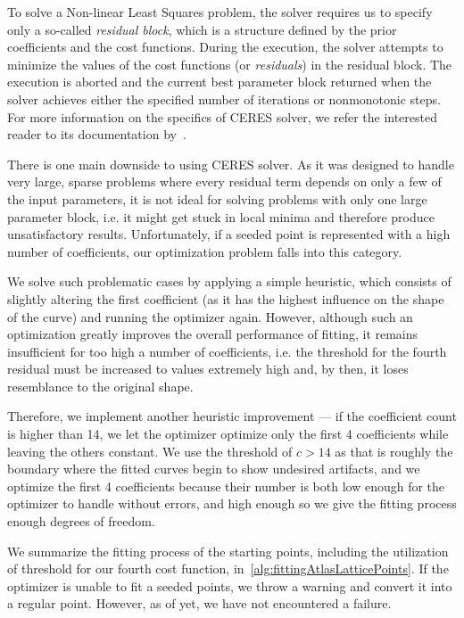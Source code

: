 To solve a Non-linear Least Squares problem, the solver requires us to specify only a so-called \emph{residual block}, which is a structure defined by the prior coefficients and the cost functions. During the execution, the solver attempts to minimize the values of the cost functions (or \emph{residuals}) in the residual block. The execution is aborted and the current best parameter block returned when the solver achieves either the specified number of iterations or nonmonotonic steps. For more information on the specifics of CERES solver, we refer the interested reader to its documentation by~\citet{ceresNonLinearLeastSquares}.

There is one main downside to using CERES solver. As it was designed to handle very large, sparse problems where every residual term depends on only a few of the input parameters, it is not ideal for solving problems with only one large parameter block, i.e. it might get stuck in local minima and therefore produce unsatisfactory results. Unfortunately, if a seeded point is represented with a high number of coefficients, our optimization problem falls into this category.

We solve such problematic cases by applying a simple heuristic, which consists of slightly altering the first coefficient (as it has the highest influence on the shape of the curve) and running the optimizer again. However, although such an optimization greatly improves the overall performance of fitting, it remains insufficient for too high a number of coefficients, i.e. the threshold for the fourth residual must be increased to values extremely high and, by then, it loses resemblance to the original shape.

Therefore, we implement another heuristic improvement --- if the coefficient count is higher than 14, we let the optimizer optimize only the first 4 coefficients while leaving the others constant. We use the threshold of $c > 14$ as that is roughly the boundary where the fitted curves begin to show undesired artifacts, and we optimize the first 4 coefficients because their number is both low enough for the optimizer to handle without errors, and high enough so we give the fitting process enough degrees of freedom.

We summarize the fitting process of the starting points, including the utilization of threshold for our fourth cost function, in~\cref{alg:fittingAtlasLatticePoints}. If the optimizer is unable to fit a seeded points, we throw a warning and convert it into a regular point. However, as of yet, we have not encountered a failure.

